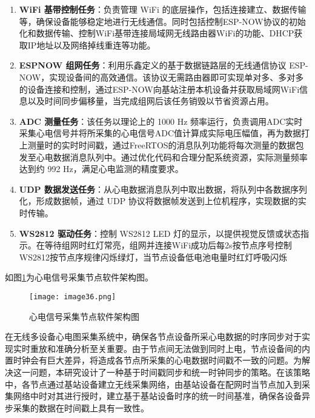 \begin{enumerate}
    \item \textbf{WiFi 基带控制任务}：负责管理 WiFi 的底层操作，包括连接建立、数据传输等，确保设备能够稳定地进行无线通信。同时包括控制ESP-NOW协议的初始化和数据传输、控制WiFi基带连接局域网无线路由器WiFi的功能、DHCP获取IP地址以及网络掉线重连等功能。
    
    \item \textbf{ESPNOW 组网任务}：利用乐鑫定义的基于数据链路层的无线通信协议 ESP-NOW，实现设备间的高效通信。该协议无需路由器即可实现单对多、多对多的设备连接和控制，通过ESP-NOW向基站注册本机设备并获取局域网WiFi信息以及时间同步偏移量，当完成组网后该任务销毁以节省资源占用。

    \item \textbf{ADC 测量任务}：该任务以理论上的 1000 Hz 频率运行，负责调用ADC实时采集心电信号并将所采集的心电信号ADC值计算成实际电压幅值，再为数据打上测量时的实时时间戳，通过FreeRTOS的消息队列功能将每次测量的数据包发至心电数据消息队列中。通过优化代码和合理分配系统资源，实际测量频率达到约 992 Hz，满足心电监测的精度要求。
    
    \item \textbf{UDP 数据发送任务}：从心电数据消息队列中取出数据，将队列中各数据序列化，形成数据帧，通过 UDP 协议将数据帧发送到上位机程序，实现数据的实时传输。

    \item \textbf{WS2812 驱动任务}：控制 WS2812 LED 灯的显示，以提供视觉反馈或状态指示。在等待组网时红灯常亮，组网并连接WiFi成功后每2s按节点序号控制WS2812按节点序规律闪烁绿灯，当节点设备低电池电量时红灯呼吸闪烁
\end{enumerate}

如图\ref{F.ECG_image36}为心电信号采集节点软件架构图。

\begin{figure}[htb]
    \centering
    \texttt{[image: image36.png]}
    \caption{心电信号采集节点软件架构图}
    \label{F.ECG_image36}
\end{figure}

在无线多设备心电图采集系统中，确保各节点设备所采心电数据的时序同步对于实现实时重放和准确分析至关重要。由于节点间无法做到同时上电，节点设备间的内置时钟会有巨大差异，将造成各节点所采集的心电数据时间戳不一致的问题。为解决这一问题，本研究设计了一种基于时间戳同步和统一时钟同步的策略。在该策略中，各节点通过基站设备建立无线采集网络，由基站设备在配网时当节点加入到采集网络中时对其进行授时，建立基于基站设备时序的统一时间基准，确保各设备异步采集的数据在时间戳上具有一致性。

